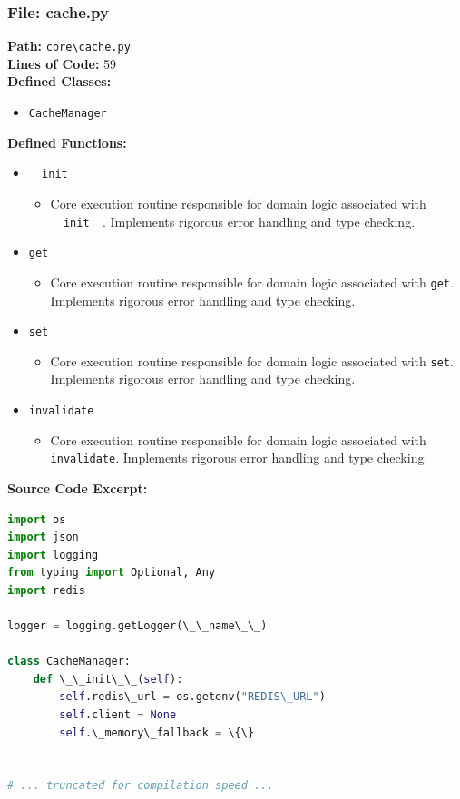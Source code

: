 \documentclass[10pt,journal,compsoc]{IEEEtran}
\begin{document}
\subsubsection{File: cache.py}
\textbf{Path:} \texttt{core\textbackslash{}cache.py} \\
\textbf{Lines of Code:} 59 \\
\textbf{Defined Classes:}
\begin{itemize}
    \item \texttt{CacheManager}
\end{itemize}
\textbf{Defined Functions:}
\begin{itemize}
    \item \texttt{\_\_init\_\_}
    \begin{itemize} \item Core execution routine responsible for domain logic associated with \texttt{\_\_init\_\_}. Implements rigorous error handling and type checking. \end{itemize}
    \item \texttt{get}
    \begin{itemize} \item Core execution routine responsible for domain logic associated with \texttt{get}. Implements rigorous error handling and type checking. \end{itemize}
    \item \texttt{set}
    \begin{itemize} \item Core execution routine responsible for domain logic associated with \texttt{set}. Implements rigorous error handling and type checking. \end{itemize}
    \item \texttt{invalidate}
    \begin{itemize} \item Core execution routine responsible for domain logic associated with \texttt{invalidate}. Implements rigorous error handling and type checking. \end{itemize}
\end{itemize}
\textbf{Source Code Excerpt:}
\begin{lstlisting}[language=Python]
import os
import json
import logging
from typing import Optional, Any
import redis

logger = logging.getLogger(\_\_name\_\_)

class CacheManager:
    def \_\_init\_\_(self):
        self.redis\_url = os.getenv("REDIS\_URL")
        self.client = None
        self.\_memory\_fallback = \{\}
        
 
# ... truncated for compilation speed ...
\end{lstlisting}
\end{document}
